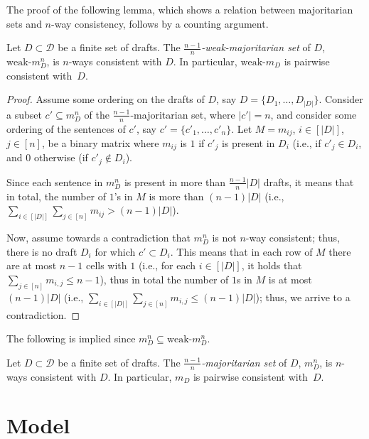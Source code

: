 \documentclass[sigconf]{aamas}  %
\newcommand{\calD}{\mathcal{D}}
\begin{document}
The proof of the following lemma, which shows a relation between majoritarian sets and $n$-way consistency, follows by a counting argument.

\begin{lemma}\label{lemma:wm-nwc}
  Let $D \subset \calD$ be a finite set of drafts. The \emph{$\frac{n-1}{n}$-weak-majoritarian set} of $D$, $\textrm{weak-}m^n_D$, is $n$-ways consistent with $D$. In particular, $\textrm{weak-}m_D$ is pairwise consistent with~$D$.
\end{lemma}

\begin{proof}
%
Assume some ordering on the drafts of $D$, say $D = \{D_1, \ldots, D_{|D|}\}$.
%
Consider a subset $c' \subseteq m^n_D$ of the $\frac{n-1}{n}$-majoritarian set, where $|c'| = n$, and consider some ordering of the sentences of $c'$, say $c' = \{c'_1, \ldots, c'_n\}$.
%
Let $M = m_{ij}$, $i \in [|D|]$, $j \in [n]$, be a binary matrix where $m_{ij}$ is $1$ if $c'_j$ is present in $D_i$ (i.e., if $c'_j \in D_i$, and $0$ otherwise (if $c'_j \notin D_i$).

Since each sentence in $m^n_D$ is present in more than $\frac{n-1}{n}|D|$ drafts, it means that in total, the number of $1$'s in $M$ is more than $(n-1)|D|$  (i.e., $\sum_{i \in [|D|]} \sum_{j \in [n]} m_{ij} > (n - 1)|D|$).

Now, assume towards a contradiction that $m^n_D$ is not $n$-way consistent; thus, there is no draft $D_i$ for which $c' \subset D_i$. This means that in each row of $M$ there are at most $n - 1$ cells with $1$ (i.e., for each $i \in [|D|]$, it holds that $\sum_{j \in [n]} m_{i,j} \leq n - 1$), thus in total the number of $1$s in $M$ is at most $(n - 1)|D|$ (i.e., $\sum_{i \in [|D|]}\sum_{j \in [n]} m_{i,j} \leq (n - 1)|D|$); thus, we arrive to a contradiction.
%
\end{proof}

The following is implied since $m^n_D \subseteq \textrm{weak-}m^n_D$.

\begin{corollary}
  Let $D \subset \calD$ be a finite set of drafts. The \emph{$\frac{n-1}{n}$-majoritarian set} of $D$, $m^n_D$, is $n$-ways consistent with $D$. In particular, $m_D$ is pairwise consistent with~$D$.
\end{corollary}


\section{Model}\label{section:model}
\end{document}
